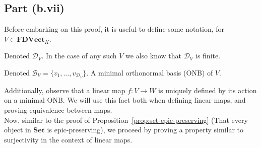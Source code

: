 \subsection{Part (b.vii)}\label{sec:q-1-b-vii}

Before embarking on this proof, it is useful to define some notation, for $V\in\mathbf{FDVect}_K$.

\newcommand{\Dim}[1]{\mathcal{D}_{#1}}
\begin{definition}[Dimension of $V$]
  Denoted $\Dim{V}$. In the case of any such $V$ we also know that $\Dim{V}$ is finite.
\end{definition}

\newcommand{\Basis}[1]{\mathcal{B}_{#1}}
\begin{definition}[Basis of $V$]
  Denoted $\Basis{V} =\{v_1,\ldots,v_{\Dim{V}}\}$. A minimal orthonormal basis (ONB) of $V$.
\end{definition}

Additionally, observe that a linear map $f : V \to W$ is uniquely defined by its action on a minimal ONB. We will use this fact both when defining linear maps, and proving equivalence between maps.\\[1em]

Now, similar to the proof of Proposition~\ref{prop:set-epic-preserving} (That every object in $\mathbf{Set}$ is epic-preserving), we proceed by proving a property similar to surjectivity in the context of linear maps.

